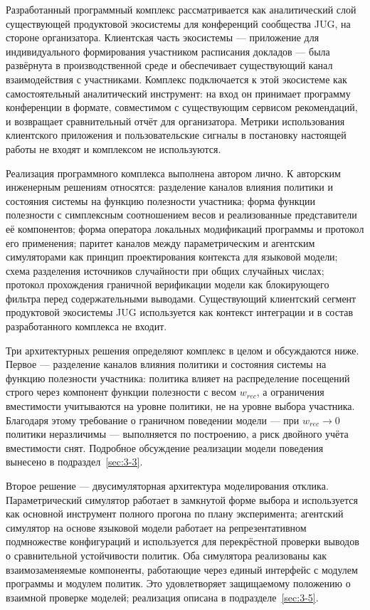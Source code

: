 Разработанный программный комплекс рассматривается как аналитический слой существующей продуктовой экосистемы для конференций сообщества JUG, на стороне организатора. Клиентская часть экосистемы --- приложение для индивидуального формирования участником расписания докладов --- была развёрнута в производственной среде и обеспечивает существующий канал взаимодействия с участниками. Комплекс подключается к этой экосистеме как самостоятельный аналитический инструмент: на вход он принимает программу конференции в формате, совместимом с существующим сервисом рекомендаций, и возвращает сравнительный отчёт для организатора. Метрики использования клиентского приложения и пользовательские сигналы в постановку настоящей работы не входят и комплексом не используются.

Реализация программного комплекса выполнена автором лично. К авторским инженерным решениям относятся: разделение каналов влияния политики и состояния системы на функцию полезности участника; форма функции полезности с симплексным соотношением весов и реализованные представители её компонентов; форма оператора локальных модификаций программы и протокол его применения; паритет каналов между параметрическим и агентским симуляторами как принцип проектирования контекста для языковой модели; схема разделения источников случайности при общих случайных числах; протокол прохождения граничной верификации модели как блокирующего фильтра перед содержательными выводами. Существующий клиентский сегмент продуктовой экосистемы JUG используется как контекст интеграции и в состав разработанного комплекса не входит.

Три архитектурных решения определяют комплекс в целом и обсуждаются ниже. Первое --- разделение каналов влияния политики и состояния системы на функцию полезности участника: политика влияет на распределение посещений строго через компонент функции полезности с весом $w_{rec}$, а ограничения вместимости учитываются на уровне политики, не на уровне выбора участника. Благодаря этому требование о граничном поведении модели --- при $w_{rec} \to 0$ политики неразличимы --- выполняется по построению, а риск двойного учёта вместимости снят. Подробное обсуждение реализации модели поведения вынесено в подраздел~\ref{sec:3-3}.

Второе решение --- двусимуляторная архитектура моделирования отклика. Параметрический симулятор работает в замкнутой форме выбора и используется как основной инструмент полного прогона по плану эксперимента; агентский симулятор на основе языковой модели работает на репрезентативном подмножестве конфигураций и используется для перекрёстной проверки выводов о сравнительной устойчивости политик. Оба симулятора реализованы как взаимозаменяемые компоненты, работающие через единый интерфейс с модулем программы и модулем политик. Это удовлетворяет защищаемому положению о взаимной проверке моделей; реализация описана в подразделе~\ref{sec:3-5}.


